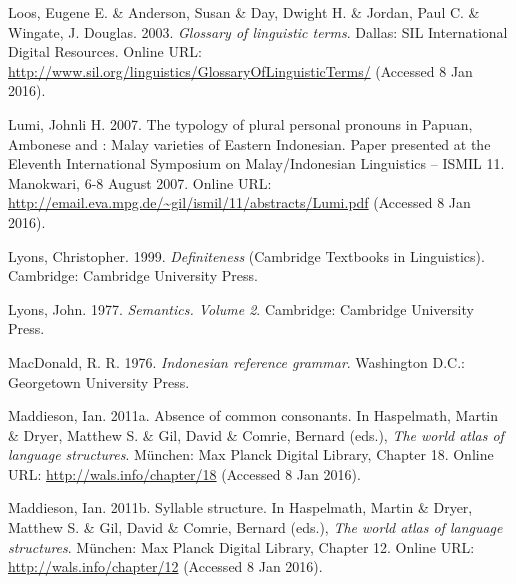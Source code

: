 \begin{styleCitaviBibliographyEntry}
Loos, Eugene E. \& Anderson, Susan \& Day, Dwight H. \& Jordan, Paul C. \& Wingate, J. Douglas. 2003. \textit{Glossary of linguistic terms}. Dallas: SIL International Digital Resources. Online URL: \url{http://www.sil.org/linguistics/GlossaryOfLinguisticTerms/} (Accessed 8 Jan 2016).
\end{styleCitaviBibliographyEntry}

\begin{styleCitaviBibliographyEntry}
Lumi, Johnli H. 2007. The typology of plural personal pronouns in Papuan, Ambonese and : Malay varieties of Eastern Indonesian. Paper presented at the Eleventh International Symposium on Malay/Indonesian Linguistics – ISMIL 11. Manokwari, 6-8 August 2007. Online URL: \url{http://email.eva.mpg.de/~gil/ismil/11/abstracts/Lumi.pdf} (Accessed 8 Jan 2016).
\end{styleCitaviBibliographyEntry}

\begin{styleCitaviBibliographyEntry}
Lyons, Christopher. 1999. \textit{Definiteness} (Cambridge Textbooks in Linguistics). Cambridge: Cambridge University Press.
\end{styleCitaviBibliographyEntry}

\begin{styleCitaviBibliographyEntry}
Lyons, John. 1977. \textit{Semantics. Volume 2}. Cambridge: Cambridge University Press.
\end{styleCitaviBibliographyEntry}

\begin{styleCitaviBibliographyEntry}
MacDonald, R. R. 1976. \textit{Indonesian reference grammar}. Washington D.C.: Georgetown University Press.
\end{styleCitaviBibliographyEntry}

\begin{styleCitaviBibliographyEntry}
Maddieson, Ian. 2011a. Absence of common consonants. In Haspelmath, Martin \& Dryer, Matthew S. \& Gil, David \& Comrie, Bernard (eds.), \textit{The world atlas of language structures}. München: Max Planck Digital Library, Chapter 18. Online URL: \url{http://wals.info/chapter/18} (Accessed 8 Jan 2016).
\end{styleCitaviBibliographyEntry}

\begin{styleCitaviBibliographyEntry}
Maddieson, Ian. 2011b. Syllable structure. In Haspelmath, Martin \& Dryer, Matthew S. \& Gil, David \& Comrie, Bernard (eds.), \textit{The world atlas of language structures}. München: Max Planck Digital Library, Chapter 12. Online URL: \url{http://wals.info/chapter/12} (Accessed 8 Jan 2016).
\end{styleCitaviBibliographyEntry}

